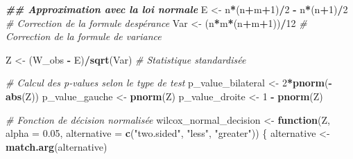 \documentclass[
  12pt,
]{article}
\newenvironment{Shaded}{\begin{snugshade}}{\end{snugshade}}
\newcommand{\AttributeTok}[1]{\textcolor[rgb]{0.13,0.29,0.53}{#1}}
\newcommand{\CommentTok}[1]{\textcolor[rgb]{0.56,0.35,0.01}{\textit{#1}}}
\newcommand{\ControlFlowTok}[1]{\textcolor[rgb]{0.13,0.29,0.53}{\textbf{#1}}}
\newcommand{\DecValTok}[1]{\textcolor[rgb]{0.00,0.00,0.81}{#1}}
\newcommand{\DocumentationTok}[1]{\textcolor[rgb]{0.56,0.35,0.01}{\textbf{\textit{#1}}}}
\newcommand{\FloatTok}[1]{\textcolor[rgb]{0.00,0.00,0.81}{#1}}
\newcommand{\FunctionTok}[1]{\textcolor[rgb]{0.13,0.29,0.53}{\textbf{#1}}}
\newcommand{\NormalTok}[1]{#1}
\newcommand{\OtherTok}[1]{\textcolor[rgb]{0.56,0.35,0.01}{#1}}
\newcommand{\SpecialCharTok}[1]{\textcolor[rgb]{0.81,0.36,0.00}{\textbf{#1}}}
\newcommand{\StringTok}[1]{\textcolor[rgb]{0.31,0.60,0.02}{#1}}
\begin{document}
\begin{Shaded}
\begin{Highlighting}[]
\DocumentationTok{\#\# Approximation avec la loi normale}
\NormalTok{E }\OtherTok{\textless{}{-}}\NormalTok{ n}\SpecialCharTok{*}\NormalTok{(n}\SpecialCharTok{+}\NormalTok{m}\SpecialCharTok{+}\DecValTok{1}\NormalTok{)}\SpecialCharTok{/}\DecValTok{2} \SpecialCharTok{{-}}\NormalTok{ n}\SpecialCharTok{*}\NormalTok{(n}\SpecialCharTok{+}\DecValTok{1}\NormalTok{)}\SpecialCharTok{/}\DecValTok{2}  \CommentTok{\# Correction de la formule d\textquotesingle{}espérance}
\NormalTok{Var }\OtherTok{\textless{}{-}}\NormalTok{ (n}\SpecialCharTok{*}\NormalTok{m}\SpecialCharTok{*}\NormalTok{(n}\SpecialCharTok{+}\NormalTok{m}\SpecialCharTok{+}\DecValTok{1}\NormalTok{))}\SpecialCharTok{/}\DecValTok{12}        \CommentTok{\# Correction de la formule de variance}

\NormalTok{Z }\OtherTok{\textless{}{-}}\NormalTok{ (W\_obs }\SpecialCharTok{{-}}\NormalTok{ E)}\SpecialCharTok{/}\FunctionTok{sqrt}\NormalTok{(Var)     }\CommentTok{\# Statistique standardisée}

\CommentTok{\# Calcul des p{-}values selon le type de test}
\NormalTok{p\_value\_bilateral }\OtherTok{\textless{}{-}} \DecValTok{2}\SpecialCharTok{*}\FunctionTok{pnorm}\NormalTok{(}\SpecialCharTok{{-}}\FunctionTok{abs}\NormalTok{(Z))}
\NormalTok{p\_value\_gauche }\OtherTok{\textless{}{-}} \FunctionTok{pnorm}\NormalTok{(Z)}
\NormalTok{p\_value\_droite }\OtherTok{\textless{}{-}} \DecValTok{1} \SpecialCharTok{{-}} \FunctionTok{pnorm}\NormalTok{(Z)}

\CommentTok{\# Fonction de décision normalisée}
\NormalTok{wilcox\_normal\_decision }\OtherTok{\textless{}{-}} \ControlFlowTok{function}\NormalTok{(Z, }\AttributeTok{alpha =} \FloatTok{0.05}\NormalTok{, }\AttributeTok{alternative =} \FunctionTok{c}\NormalTok{(}\StringTok{"two.sided"}\NormalTok{, }\StringTok{"less"}\NormalTok{, }\StringTok{"greater"}\NormalTok{)) \{}
\NormalTok{  alternative }\OtherTok{\textless{}{-}} \FunctionTok{match.arg}\NormalTok{(alternative)}
  

\end{Highlighting}
\end{Shaded}
\end{document}
